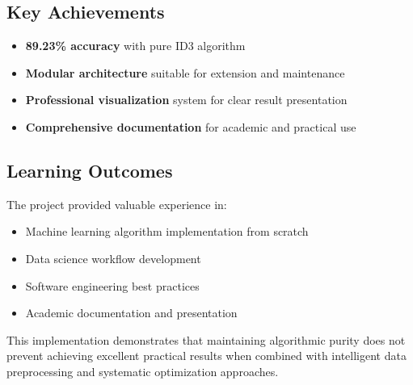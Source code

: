 \documentclass[12pt,a4paper]{article}
\begin{document}
\subsection{Key Achievements}
\begin{itemize}
    \item \textbf{89.23\% accuracy} with pure ID3 algorithm
    \item \textbf{Modular architecture} suitable for extension and maintenance
    \item \textbf{Professional visualization} system for clear result presentation
    \item \textbf{Comprehensive documentation} for academic and practical use
\end{itemize}

\subsection{Learning Outcomes}
The project provided valuable experience in:
\begin{itemize}
    \item Machine learning algorithm implementation from scratch
    \item Data science workflow development
    \item Software engineering best practices
    \item Academic documentation and presentation
\end{itemize}

This implementation demonstrates that maintaining algorithmic purity does not prevent achieving excellent practical results when combined with intelligent data preprocessing and systematic optimization approaches.
\end{document}
